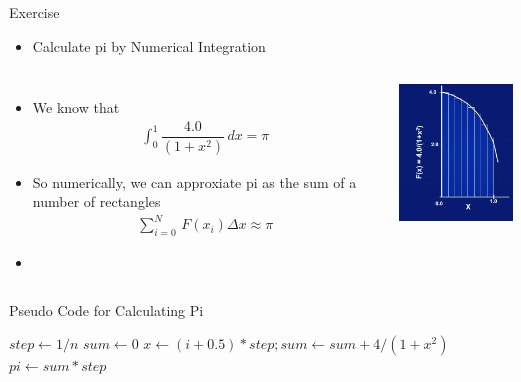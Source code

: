 \documentclass[10pt,t]{beamer}
\begin{document}
\begin{frame}[allowframebreaks]{Exercise}
  \framebreak
  \begin{itemize}\item {Calculate pi by Numerical Integration} \end{itemize}
  \begin{columns}
    \column{5cm}
    \begin{itemize}
    \item We know that
      \begin{align*}
        \int^1_0 \dfrac{4.0}{(1+x^2)}\, dx = \pi
      \end{align*}
    \item So numerically, we can approxiate pi as the sum of a number of rectangles
      \begin{align*}
        \sum^N_{i=0}\,F(x_i)\Delta x \approx \pi
      \end{align*}
    \item[] 
    \end{itemize}
    \column{5cm}
    \begin{center}
      \includegraphics[width=4cm]{./graphics/pi}
    \end{center}
  \end{columns}
  
  \begin{algorithm}[H]
    \caption{Pseudo Code for Calculating Pi}
    \begin{algorithmic}
      \State $step \gets 1/n$
      \State $sum \gets 0$
      \State $x \gets (i+0.5)*step; sum \gets sum + 4/(1+x^2)$
      \EndDo
      \State $pi \gets sum * step$
      \EndFunction
    \end{algorithmic}
  \end{algorithm}
\end{frame}
\end{document}
